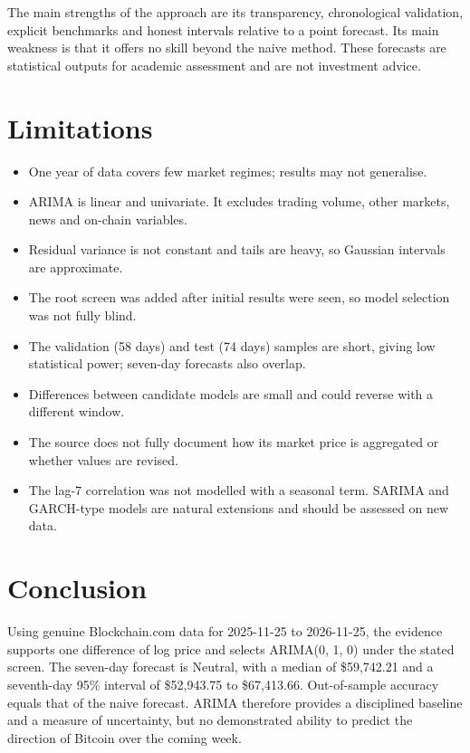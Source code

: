 \documentclass[11pt,a4paper]{article}
\begin{document}
The main strengths of the approach are its transparency, chronological validation, explicit benchmarks and honest intervals relative to a point forecast. Its main weakness is that it offers no skill beyond the naive method. These forecasts are statistical outputs for academic assessment and are not investment advice.

\section{Limitations}

\begin{itemize}
  \item One year of data covers few market regimes; results may not generalise.
  \item ARIMA is linear and univariate. It excludes trading volume, other markets, news and on-chain variables.
  \item Residual variance is not constant and tails are heavy, so Gaussian intervals are approximate.
  \item The root screen was added after initial results were seen, so model selection was not fully blind.
  \item The validation (58 days) and test (74 days) samples are short, giving low statistical power; seven-day forecasts also overlap.
  \item Differences between candidate models are small and could reverse with a different window.
  \item The source does not fully document how its market price is aggregated or whether values are revised.
  \item The lag-7 correlation was not modelled with a seasonal term. SARIMA and GARCH-type models are natural extensions and should be assessed on new data.
\end{itemize}

\section{Conclusion}

Using genuine Blockchain.com data for 2025-11-25 to 2026-11-25, the evidence supports one difference of log price and selects ARIMA(0, 1, 0) under the stated screen. The seven-day forecast is Neutral, with a median of \$59,742.21 and a seventh-day 95\% interval of \$52,943.75 to \$67,413.66. Out-of-sample accuracy equals that of the naive forecast. ARIMA therefore provides a disciplined baseline and a measure of uncertainty, but no demonstrated ability to predict the direction of Bitcoin over the coming week.
\end{document}
